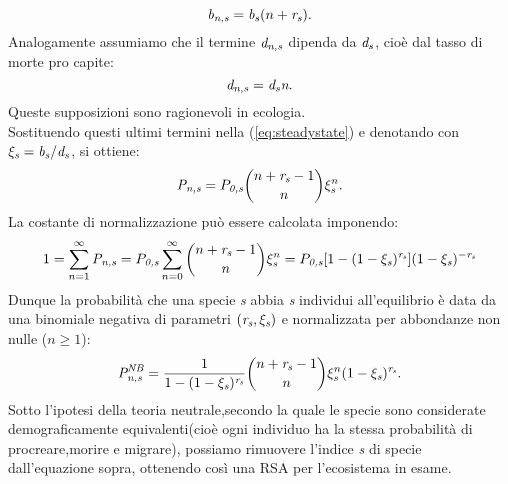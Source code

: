 \begin{equation}
\emph{b}_\emph{n,s}=\emph{b}_\emph{s}(n+\emph{r}_\emph{s}).
\label{eq:birthNB}
\end{equation}
Analogamente assumiamo che il termine $\emph{d}_\emph{n,s}$ dipenda da $\emph{d}_\emph{s}$, cioè dal tasso di morte pro capite:
\begin{equation}
\emph{d}_\emph{n,s}=\emph{d}_\emph{s}\emph{n}.
\label{eq:deathNB}
\end{equation}
Queste supposizioni sono ragionevoli in ecologia.\\
Sostituendo questi ultimi termini nella (\ref{eq:steadystate}) e denotando con $\xi_\emph{s}=\emph{b}_\emph{s}/\emph{d}_\emph{s}$, si ottiene:
$$
\emph{P}_\emph{n,s}=P_\emph{0,s}\binom{n+\emph{r}_\emph{s}-1}{n}\xi_\emph{s}^n.
$$
La costante di normalizzazione può essere calcolata imponendo:
$$
1=\sum_{n=1}^\infty \emph{P}_{\emph{n,s}}=P_\emph{0,s}\sum_{n=0}^\infty\binom{n+\emph{r}_\emph{s}-1}{n}\xi_\emph{s}^n=P_\emph{0,s}[1-(1-\xi_\emph{s})^{\emph{r}_\emph{s}}](1-\xi_\emph{s})^{-\emph{r}_\emph{s}}
$$
Dunque la probabilità che una specie \emph{s} abbia \emph{s} individui all'equilibrio è data da una binomiale negativa di parametri $(\emph{r}_\emph{s}, \xi_\emph{s})$ e normalizzata per abbondanze non nulle ($n\ge 1$):
\begin{equation}
\emph{P}_\emph{n,s}^{\emph{NB}}=\frac{1}{1-(1-\xi_\emph{s})^{\emph{r}_\emph{s}}}\binom{n+\emph{r}_\emph{s}-1}{n}\xi_\emph{s}^n(1-\xi_\emph{s})^{\emph{r}_\emph{s}}.
\label{eq:NBprobability}
\end{equation}
Sotto l'ipotesi della teoria neutrale,secondo la quale le specie sono considerate demograficamente equivalenti(cioè ogni individuo ha la stessa probabilità di procreare,morire e migrare), possiamo rimuovere l'indice \emph{s} di specie dall'equazione sopra, ottenendo così una RSA per l'ecosistema in esame.

